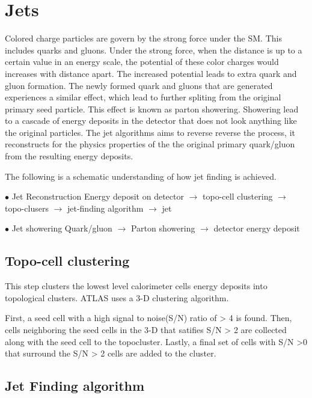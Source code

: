 \section{Jets}
\label{sec:Jet}
Colored charge particles are govern by the strong force under the SM. This includes quarks and gluons. Under the strong force, when the distance is up to a certain value in an energy scale, the potential of these color charges would increases with distance apart. The increased potential leads to extra quark and gluon formation. The newly formed quark and gluons that are generated experiences a similar effect, which lead to further spliting from the original primary seed particle. This effect is known as parton showering. 
Showering lead to a cascade of energy deposits in the detector that does not look anything like the original particles. The jet algorithms aims to reverse reverse the process, it reconstructs for the physics properties of the the original primary quark/gluon from the resulting energy deposits. 

The following is a schematic understanding of how jet finding is achieved. 

$\bullet$ Jet Reconstruction
Energy deposit on detector  $\rightarrow$  topo-cell clustering $\rightarrow$  topo-clusers $\rightarrow$  jet-finding algorithm $\rightarrow$ jet

$\bullet$ Jet showering
Quark/gluon $\rightarrow$  Parton showering $\rightarrow$ detector energy deposit

% 
\subsection*{Topo-cell clustering}
\label{Topocell clustering}
This step clusters the lowest level calorimeter cells energy deposits into topological clusters. ATLAS uses a 3-D clustering algorithm. 

First, a seed cell with a high signal to noise(S/N) ratio of > 4 is found. Then, cells neighboring the seed cells in the 3-D that satifies S/N > 2 are collected along with the seed cell to the topocluster. Lastly, a final set of cells with S/N >0 that surround the S/N > 2 cells are added to the cluster. 

\subsection*{Jet Finding algorithm}
\label{sec:JetFinding}

